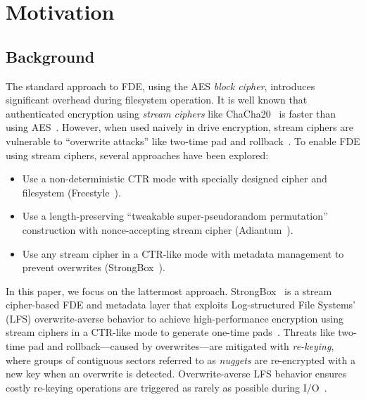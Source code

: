 \section{Motivation}\label{sec:motivation}

\subsection{Background}


The standard approach to FDE, using the AES \emph{block cipher}, introduces
significant overhead during filesystem operation. It is well known that
authenticated encryption using \emph{stream ciphers} like
ChaCha20~\cite{ChaCha20} is faster than using AES~\cite{StrongBox, AnotherPaper,
AnotherPaper}. However, when used naively in drive encryption, stream ciphers
are vulnerable to ``overwrite attacks'' like two-time pad and
rollback~\cite{StrongBox}. To enable FDE using stream ciphers, several
approaches have been explored:

\begin{itemize}
   \item Use a non-deterministic CTR mode with specially designed cipher and
   filesystem (Freestyle~\cite{Freestyle}).
   \item Use a length-preserving ``tweakable super-pseudorandom permutation''
   construction with nonce-accepting stream cipher (Adiantum~\cite{Adiantum}).
   \item Use any stream cipher in a CTR-like mode with metadata management to
   prevent overwrites (StrongBox~\cite{StrongBox}).
\end{itemize}

In this paper, we focus on the lattermost approach. StrongBox~\cite{StrongBox}
is a stream cipher-based FDE and metadata layer that exploits Log-structured
File Systems' (LFS) overwrite-averse behavior to achieve high-performance
encryption using stream ciphers in a CTR-like mode to generate one-time
pads~\cite{OTP}. Threats like two-time pad and rollback---caused by
overwrites---are mitigated with \emph{re-keying}, where groups of contiguous
sectors referred to as \emph{nuggets} are re-encrypted with a new key when an
overwrite is detected. Overwrite-averse LFS behavior ensures costly re-keying
operations are triggered as rarely as possible during I/O~\cite{StrongBox}.


